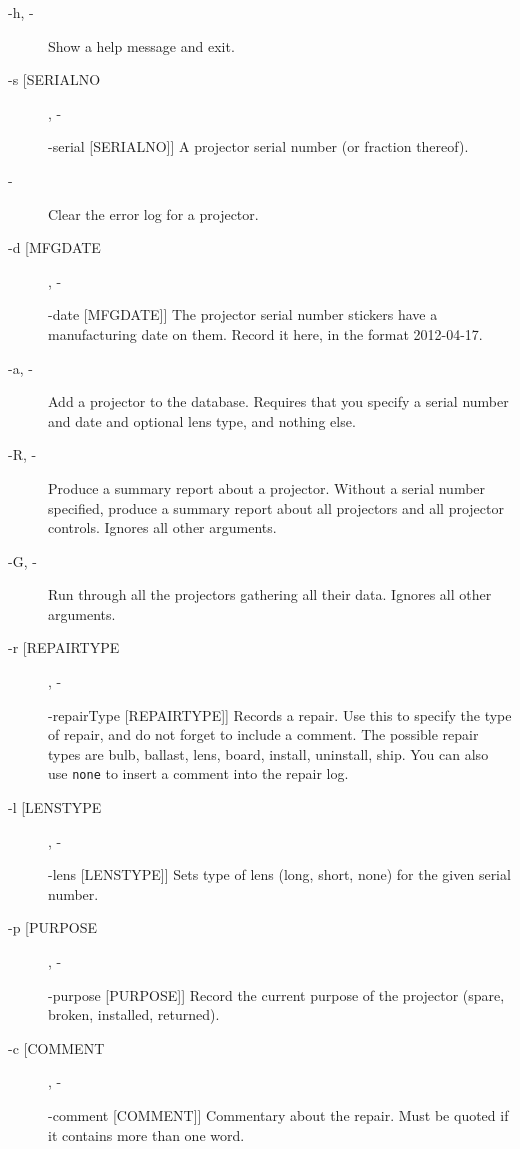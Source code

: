\documentclass[11pt]{article}
\newcommand{\cmd}[1]{\texttt{#1}\xspace}
\newcommand{\longcommand}[1]{-\rule{0pt}{1pt}-#1}
\newcommand{\argle}[1]{[#1]}
\begin{document}
\begin{description}
\item[-h, \longcommand{help}] Show a help message and exit.
\item[-s \argle{SERIALNO}, \longcommand{serial} \argle{SERIALNO}]
                        A projector serial number (or fraction
                        thereof).
\item[\longcommand{clearErrs}]   Clear the error log for a projector.
\item[-d \argle{MFGDATE}, \longcommand{date} \argle{MFGDATE}]
                        The projector serial number stickers have a
                        manufacturing date on them. Record it here, in the
                        format 2012-04-17.
\item[-a, \longcommand{add}] Add a projector to the
                        database. Requires that you specify a serial number
                        and date and optional lens type, and nothing else.
\item[-R, \longcommand{report}]     Produce a summary report about a projector. Without a
                        serial number specified, produce a summary report
                        about all projectors and all projector controls.
                        Ignores all other arguments.
\item[-G, \longcommand{gather}]    Run through all the projectors gathering all their
                        data. Ignores all other arguments.
\item[-r \argle{REPAIRTYPE}, \longcommand{repairType} \argle{REPAIRTYPE}]
                        Records a repair. Use this to
                        specify the type of repair, and do not forget to
                        include a comment.  The possible repair types
                        are bulb, ballast, lens, board, install,
                        uninstall, ship.  You can also use \cmd{none} to
                        insert a comment into the repair log.
\item[-l \argle{LENSTYPE}, \longcommand{lens} \argle{LENSTYPE}]
                        Sets type of lens (long, short, none) for the given
                        serial number.
\item[-p \argle{PURPOSE}, \longcommand{purpose} \argle{PURPOSE}]
                        Record the current purpose of the projector (spare,
                        broken, installed, returned).
\item[-c \argle{COMMENT}, \longcommand{comment} \argle{COMMENT}]
                        Commentary about the repair.  Must be quoted
                        if it contains more than one word.

                      \end{description}
\end{document}

